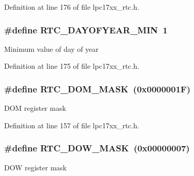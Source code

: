 \-Definition at line 176 of file lpc17xx\-\_\-rtc.\-h.

\hypertarget{group___r_t_c___private___macros_ga132dcf308a59affe54749f4f11cd22a6}{
\subsubsection[{\-R\-T\-C\-\_\-\-D\-A\-Y\-O\-F\-Y\-E\-A\-R\-\_\-\-M\-I\-N}]{\setlength{\rightskip}{0pt plus 5cm}\#define {\bf \-R\-T\-C\-\_\-\-D\-A\-Y\-O\-F\-Y\-E\-A\-R\-\_\-\-M\-I\-N}~1}}\label{group___r_t_c___private___macros_ga132dcf308a59affe54749f4f11cd22a6}
\-Minimum value of day of year 

\-Definition at line 175 of file lpc17xx\-\_\-rtc.\-h.

\hypertarget{group___r_t_c___private___macros_ga7c4ea655a8ccf43870c672c1058a133e}{
\subsubsection[{\-R\-T\-C\-\_\-\-D\-O\-M\-\_\-\-M\-A\-S\-K}]{\setlength{\rightskip}{0pt plus 5cm}\#define {\bf \-R\-T\-C\-\_\-\-D\-O\-M\-\_\-\-M\-A\-S\-K}~(0x0000001\-F)}}\label{group___r_t_c___private___macros_ga7c4ea655a8ccf43870c672c1058a133e}
\-D\-O\-M register mask 

\-Definition at line 157 of file lpc17xx\-\_\-rtc.\-h.

\hypertarget{group___r_t_c___private___macros_ga6564edf565a643214a54ffac364c69ca}{
\subsubsection[{\-R\-T\-C\-\_\-\-D\-O\-W\-\_\-\-M\-A\-S\-K}]{\setlength{\rightskip}{0pt plus 5cm}\#define {\bf \-R\-T\-C\-\_\-\-D\-O\-W\-\_\-\-M\-A\-S\-K}~(0x00000007)}}\label{group___r_t_c___private___macros_ga6564edf565a643214a54ffac364c69ca}
\-D\-O\-W register mask 

